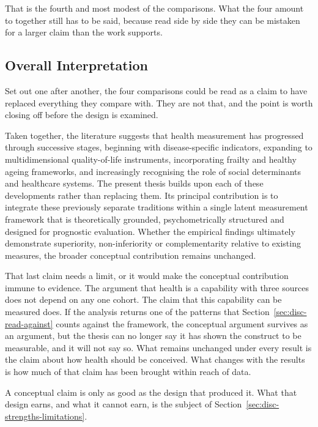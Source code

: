 That is the fourth and most modest of the comparisons. What the four amount to
together still has to be said, because read side by side they can be mistaken for
a larger claim than the work supports.

\subsection{Overall Interpretation}
\label{sec:disc-overall}

Set out one after another, the four comparisons could be read as a claim to have
replaced everything they compare with. They are not that, and the point is worth
closing off before the design is examined.

Taken together, the literature suggests that health measurement has progressed through successive stages, beginning with disease-specific indicators, expanding to multidimensional quality-of-life instruments, incorporating frailty and healthy ageing frameworks, and increasingly recognising the role of social determinants and healthcare systems. The present thesis builds upon each of these developments rather than replacing them. Its principal contribution is to integrate these previously separate traditions within a single latent measurement framework that is theoretically grounded, psychometrically structured and designed for prognostic evaluation. Whether the empirical findings ultimately demonstrate superiority, non-inferiority or complementarity relative to existing measures, the broader conceptual contribution remains unchanged.

That last claim needs a limit, or it would make the conceptual contribution
immune to evidence. The argument that health is a capability with three sources
does not depend on any one cohort. The claim that this capability can be measured
does. If the analysis returns one of the patterns that Section~\ref{sec:disc-read-against}
counts against the framework, the conceptual argument survives as an argument, but
the thesis can no longer say it has shown the construct to be measurable, and it
will not say so. What remains unchanged under every result is the claim about how
health should be conceived. What changes with the results is how much of that claim
has been brought within reach of data.

A conceptual claim is only as good as the design that produced it. What that
design earns, and what it cannot earn, is the subject of
Section~\ref{sec:disc-strengths-limitations}.

